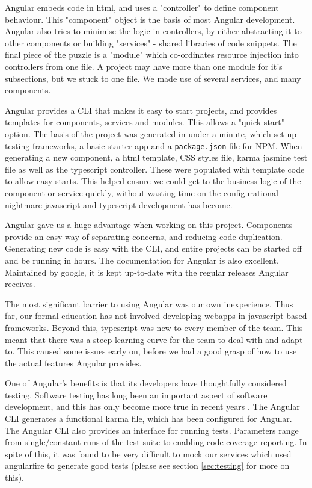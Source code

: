 \documentclass{l3proj}
\begin{document}
Angular embeds code in html, and uses a "controller" to define component behaviour. This
 "component" object is the basis of most Angular development. Angular also tries 
 to minimise the logic in controllers, by either abstracting it to other components
 or building "services" - shared libraries of code snippets. The final piece of the puzzle
 is a "module" which co-ordinates resource injection into controllers from one 
 file. A project may have more than one module for it's subsections, but we stuck to
 one file. We made use of several services, and many components.
  
Angular provides a CLI that makes it easy to start projects, and provides 
 templates for components, services and modules. This allows a "quick start"
 option. The basis of the project was generated in under a minute, which set up
 testing frameworks, a basic starter app and a \texttt{package.json} file for NPM.
 When generating a new component, a html template, CSS styles file, karma 
 jasmine test file as well as the typescript controller. These were populated
 with template code to allow easy starts. This helped ensure we could get to 
 the business logic of the component or service quickly, without wasting time 
 on the configurational nightmare javascript and typescript development has
 become.
  
    
  
Angular gave us a huge advantage when working on this project. Components provide
 an easy way of separating concerns, and reducing code duplication. Generating new
 code is easy with the CLI, and entire projects can be started off and be running
 in hours. The documentation for Angular is also excellent. Maintained by google,
 it is kept up-to-date with the regular releases Angular receives.
 
The most significant barrier to using Angular was our own inexperience. 
 Thus far, our formal education has not involved developing webapps in
 javascript based frameworks. Beyond this, typescript was new to every
 member of the team. This meant that there was a steep learning curve for
 the team to deal with and adapt to. This caused some issues early on, 
 before we had a good grasp of how to use the actual features Angular
 provides.
 
One of Angular's benefits is that its developers have thoughtfully
 considered testing. Software testing has long been an important
 aspect of software development, and this has only become more true
 in recent years \cite{tuteja2012testing}. The Angular CLI generates
 a functional karma file, which has been configured for Angular. The
 Angular CLI also provides an interface for running tests. Parameters 
 range from single/constant runs of the test suite to enabling code
 coverage reporting. In spite of this, it was found to be very 
 difficult to mock our services which used angularfire to generate
 good tests (please see section \ref{sec:testing} for more on this).
 
\end{document}
